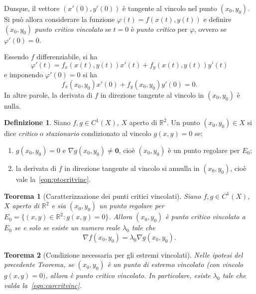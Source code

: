 \documentclass[a4paper]{book}
\numberwithin{equation}{section}
\renewcommand{\phi}{\varphi}
\theoremstyle{plain}
\newtheorem{teor}{Teorema}[section]
\theoremstyle{definition}
\newtheorem{defn}{Definizione}[section]
\theoremstyle{remark}
\renewcommand{\vec}{\boldsymbol}
\theoremstyle{example}
\begin{document}
	Dunque, il vettore $(x'(0), y'(0))$ è tangente al vincolo nel punto $(x_0, y_0)$. Si può allora considerare la funzione $\phi(t) = f(x(t), y(t))$ e definire $(x_0, y_0)$ \emph{punto critico vincolato} se $t = 0$ è \emph{punto critico} per $\phi$, ovvero se $\phi'(0) = 0$.

	Essendo $f$ differenziabile, si ha
	\begin{equation*}
		\phi'(t) = f_x(x(t), y(t))x'(t) + f_y(x(t), y(t)) y'(t)
	\end{equation*}
	e imponendo $\phi'(0) = 0$ si ha
	\begin{equation}
		\label{eqn:ptocritvinc}
		f_x(x_0, y_0)x'(0) + f_y(x_0, y_0)y'(0) = 0.
	\end{equation}
	In altre parole, la derivata di $f$ in direzione tangente al vincolo in $(x_0, y_0)$ è nulla.

	\begin{defn}
		Siano $f, g \in C^1(X)$, $X$ aperto di $\mathbb{R}^2$. Un punto $(x_0, y_0) \in X$ si dice \emph{critico} o \emph{stazionario} condizionato al vincolo $g(x, y) = 0$ se:
		\begin{enumerate}
			\item $g(x_0, y_0) = 0$ e $\nabla g(x_0, y_0) \ne \vec{0}$, cioè $(x_0, y_0)$ è un punto regolare per $E_0$;
			\item la derivata di $f$ in direzione tangente al vincolo si annulla in $(x_0, y_0)$, cioè vale la~\eqref{eqn:ptocritvinc}.
		\end{enumerate}
	\end{defn}

	\begin{teor}[Caratterizzazione dei punti critici vincolati]
		\label{teor:carcritvinc}
		Siano $f, g \in C^1(X)$, $X$ aperto di $\mathbb{R}^2$ e sia $(x_0, y_0)$ un punto regolare per $E_0 = \{ (x,y) \in \mathbb{R}^2 \colon g(x,y) = 0\}$. Allora $(x_0, y_0)$ è punto critico vincolato a $E_0$ se e solo se esiste un numero reale $\lambda_0$ tale che
		\begin{equation}
			\label{eqn:carcritvinc}
			\nabla f(x_0, y_0) = \lambda_0 \nabla g(x_0, y_0).
		\end{equation}
	\end{teor}

	\begin{teor}[Condizione necessaria per gli estremi vincolati]
		Nelle ipotesi del precedente Teorema, se $(x_0, y_0)$ è un punto di estremo vincolato (con vincolo $g(x, y) = 0)$, allora è punto critico vincolato. In particolare, esiste $\lambda_0$ tale che valda la~\eqref{eqn:carcritvinc}.
	\end{teor}
\end{document}
